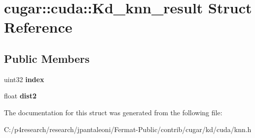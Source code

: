 \hypertarget{structcugar_1_1cuda_1_1_kd__knn__result}{}\section{cugar\+:\+:cuda\+:\+:Kd\+\_\+knn\+\_\+result Struct Reference}
\label{structcugar_1_1cuda_1_1_kd__knn__result}
\subsection*{Public Members}
\begin{DoxyCompactItemize}
\item 
\mbox{\label{structcugar_1_1cuda_1_1_kd__knn__result_afc32019ca60eb7caddb8e94870ebac16}} 
uint32 {\bfseries index}
\item 
\mbox{\label{structcugar_1_1cuda_1_1_kd__knn__result_a1e3b7d447dcb4c8342ef404e7f92200c}} 
float {\bfseries dist2}
\end{DoxyCompactItemize}


The documentation for this struct was generated from the following file\+:\begin{DoxyCompactItemize}
\item 
C\+:/p4research/research/jpantaleoni/\+Fermat-\/\+Public/contrib/cugar/kd/cuda/knn.\+h\end{DoxyCompactItemize}
